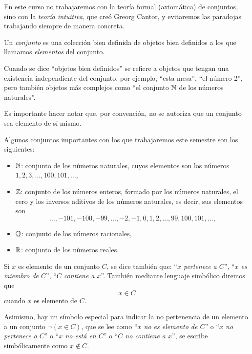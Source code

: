 En este curso no trabajaremos con la teoría formal (axiomática) de conjuntos, 
sino con la {\em teoría intuitiva}, que 
creó Greorg Cantor, y evitaremos las paradojas 
trabajando siempre de manera concreta.

\medskip

\begin{defn}[Conjunto]
Un {\em conjunto} es una colección bien definida de objetos bien definidos
a los que llamamos {\em elementos} del conjunto.
\end{defn}

Cuando se dice ``objetos bien definidos'' 
se refiere a objetos que tengan una existencia 
independiente del conjunto, por ejemplo, 
``esta mesa'', ``el número 2'', 
pero también objetos más complejos 
como ``el conjunto $\mathbb{N}$ de los números naturales''.

Es importante hacer notar que, por convenci\'on, no se autoriza que un 
conjunto sea elemento de s\'i mismo.

Algunos conjuntos importantes con los que trabajaremos este
semestre son los siguientes:
\begin{itemize}
	\item $\mathbb{N}$: conjunto de los n\'umeros naturales, cuyos elementos son los 
		n\'umeros $1,2,3,\ldots, 100, 101, \ldots$,
	\item $\mathbb{Z}$: conjunto de los n\'umeros enteros, formado por los n\'umeros
		naturales, el cero y los inversos aditivos de los 
		n\'umeros naturales, es decir, sus elementos son
		$$\ldots, -101, -100, -99, \ldots, -2, -1, 0, 1, 2,\ldots, 99, 100, 101,
		\ldots,$$
	\item $\mathbb{Q}$: conjunto de los n\'umeros racionales,
	\item $\mathbb{R}$: conjunto de los n\'umeros reales.
\end{itemize}

\bigskip 

\begin{defn}[Pertenencia]
Si $x$ es elemento de un conjunto $C$, 
se dice tambi\'en que: ``{\em $x$ pertenece a $C$}'', 
``{\em $x$ es miembro de $C$}'',  
``{\em $C$ contiene a $x$}''. 
También mediante lenguaje simbólico diremos que 
$$x\in C$$
cuando $x$ es elemento de $C$. 

Asimismo, hay un símbolo especial para indicar la no pertenencia
de un elemento a un conjunto $
\neg (x \in C)$, que se lee como 
``{\em $x$ no es
elemento de $C$}'' o ``{\em $x$ no pertenece a $C$}'' o
``{\em $x$ no est\'a en $C$}'' o ``{\em $C$ no contiene a $x$}'', 
se escribe 
simb\'olicamente como $x \not \in C$.
\end{defn}
\medskip 

